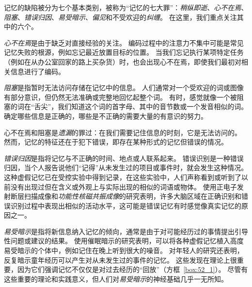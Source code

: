 记忆的缺陷被分为七个基本类别，被称为“记忆的七大罪”：\textit{稍纵即逝}、\textit{心不在焉}、\textit{阻塞}、\textit{错误归因}、\textit{易受暗示}、\textit{偏见}和不受欢迎的\textit{纠缠}。
在这里，我们重点关注其中的六个。


\textit{心不在焉}是由于缺乏对直接经验的关注。
编码过程中的注意力不集中可能是常见记忆失败的根源，例如忘记最近放置目标的位置。
当我们忘记执行某项特定任务（例如在从办公室回家的路上买杂货）时，也会出现心不在焉，即使我们最初对相关信息进行了编码。


\textit{阻塞}是指暂时无法访问存储在记忆中的信息。
人们通常对一个受欢迎的词或图像有部分意识，但仍然无法准确或完整地回忆起整个词。
有时，感觉就像一个被阻塞的词在“舌尖”，我们知道这个词的首字母、其中的音节数或一个发音相似的词。
确定哪些信息是正确的，哪些是不正确的需要大量的有意识的努力。


心不在焉和阻塞是\textit{遗漏}的罪过：在我们需要记住信息的时刻，它是无法访问的。
然而，记忆的特征还在于犯下错误，即存在某种形式的记忆但错误的情况。


\textit{错误归因}是指将记忆与不正确的时间、地点或人联系起来。
错误识别是一种错误归因，当个人报告说他们“记得”从未发生过的项目或事件时，就会发生这种情况。
这种虚假记忆已在受控实验中得到记录，在这些实验中，人们声称看到或听到了以前没有出现过但在含义或外观上与实际出现的相似的词语或物体。
使用正电子发射断层扫描成像和\textit{功能性核磁共振成像}的研究表明，许多大脑区域在正确识别和错误识别过程中表现出相似的活动水平，这可能是错误记忆有时感觉像真实记忆的原因之一。


\textit{易受暗示}是指将新信息纳入记忆的倾向，通常是由于对可能经历过的事情提出引导性问题或建议的结果。
使用催眠暗示的研究表明，可以将各种虚假记忆植入高度易受暗示的个体中，例如记住在晚上听到很大的噪音。
对年轻人的研究还表明，反复暗示童年经历可以产生对从未发生过的事件的记忆。
这些发现在理论上很重要，因为它们强调记忆不仅仅是对过去经历的“回放”（方框~\ref{box:52_1}）。
尽管有这些重要的理论和实践意义，但人们对\textit{易受暗示}的神经基础几乎一无所知。


